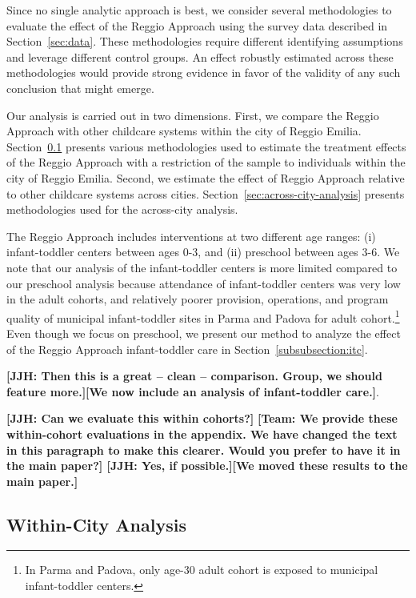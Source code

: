 Since no single analytic approach is best, we consider several methodologies to evaluate the effect of the Reggio Approach using the survey data described in Section~\ref{sec:data}. These methodologies require different identifying assumptions and leverage different control groups. An effect robustly estimated across these methodologies would provide strong evidence in favor of the validity of any such conclusion that might emerge.

Our analysis is carried out in two dimensions. First, we compare the Reggio Approach with other childcare systems within the city of Reggio Emilia. Section~\ref{sec:within-city-analysis} presents various methodologies used to estimate the treatment effects of the Reggio Approach with a restriction of the sample to individuals within the city of Reggio Emilia. Second, we estimate the effect of Reggio Approach relative to other childcare systems across cities. Section~\ref{sec:across-city-analysis} presents methodologies used for the across-city analysis.

The Reggio Approach includes interventions at two different age ranges: (i) infant-toddler centers between ages 0-3, and (ii) preschool between ages 3-6. We note that our analysis of the infant-toddler centers is more limited compared to our preschool analysis because attendance of infant-toddler centers was very low in the adult cohorts, and relatively poorer provision, operations, and program quality of municipal infant-toddler sites in Parma and Padova for adult cohort.\footnote{In Parma and Padova, only age-30 adult cohort is exposed to municipal infant-toddler centers.} Even though we focus on preschool, we present our method to analyze the effect of the Reggio Approach infant-toddler care in Section~\ref{subsubsection:itc}.

\textbf{[JJH: Then this is a great -- clean -- comparison. Group, we should feature more.][We now include an analysis of infant-toddler care.]}. 

\textbf{[JJH: Can we evaluate this within cohorts?]} \textbf{[Team: We provide these within-cohort evaluations in the appendix. We have changed the text in this paragraph to make this clearer. Would you prefer to have it in the main paper?] [JJH: Yes, if possible.][We moved these results to the main paper.]}

\subsection{Within-City Analysis} \label{sec:within-city-analysis}


